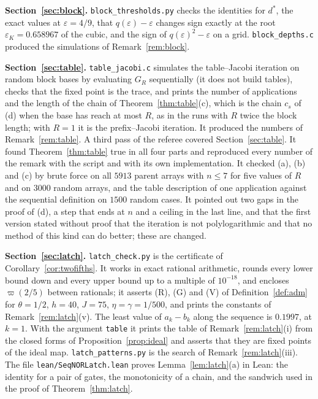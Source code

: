 \documentclass[11pt]{amsart}
\theoremstyle{definition}
\theoremstyle{remark}
\newcommand{\eps}{\varepsilon}
\begin{document}
\medskip\noindent\textbf{Section~\ref{sec:block}.} \texttt{block\_thresholds.py} checks the
identities for $d^*$, the exact values at $\eps=4/9$, that $q(\eps)-\eps$ changes sign exactly at
the root $\eps_K=0.658967$ of the cubic, and the sign of $q(\eps)^2-\eps$ on a grid.
\texttt{block\_depths.c} produced the simulations of Remark~\ref{rem:block}.

\medskip\noindent\textbf{Section~\ref{sec:table}.} \texttt{table\_jacobi.c} simulates the
table--Jacobi iteration on random block bases by evaluating $G_R$ sequentially (it does not build
tables), checks that the fixed point is the trace, and prints the number of applications and the
length of the chain of Theorem~\ref{thm:table}(c), which is the chain $c_s$ of (d) when the base
has reach at most $R$, as in the runs with $R$ twice the block length; with $R=1$ it is the
prefix--Jacobi iteration. It produced the numbers of Remark~\ref{rem:table}. A third pass of the
referee covered Section~\ref{sec:table}. It found Theorem~\ref{thm:table} true in all four parts
and reproduced every number of the remark with the script and with its own implementation. It
checked (a), (b) and (c) by brute force on all $5913$ parent arrays with $n\le7$ for five values
of $R$ and on $3000$ random arrays, and the table description of one application against the
sequential definition on $1500$ random cases. It pointed out two gaps in the proof of (d), a step
that ends at $n$ and a ceiling in the last line, and that the first version stated without proof
that the iteration is not polylogarithmic and that no method of this kind can do better; these are
changed.

\medskip\noindent\textbf{Section~\ref{sec:latch}.} \texttt{latch\_check.py} is the certificate
of Corollary~\ref{cor:twofifths}. It works in exact rational arithmetic, rounds every lower bound
down and every upper bound up to a multiple of $10^{-18}$, and encloses $\varpi(2/5)$ between
rationals; it asserts (R), (G) and (V) of Definition~\ref{def:adm} for $\theta=1/2$, $h=40$,
$J=75$, $\eta=\gamma=1/500$, and prints the constants of Remark~\ref{rem:latch}(v). The least
value of $a_k-b_k$ along the sequence is $0.1997$, at $k=1$. With the argument \texttt{table} it
prints the table of Remark~\ref{rem:latch}(i) from the closed forms of
Proposition~\ref{prop:ideal} and asserts that they are fixed points of the ideal map.
\texttt{latch\_patterns.py} is the search of Remark~\ref{rem:latch}(iii). The file
\texttt{lean/SeqNORLatch.lean} proves Lemma~\ref{lem:latch}(a) in Lean: the identity for a pair of
gates, the monotonicity of a chain, and the sandwich used in the proof of
Theorem~\ref{thm:latch}.
\end{document}
